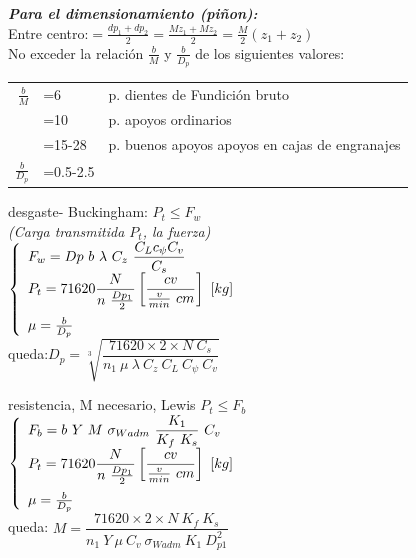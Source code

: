 \documentclass[11pt,a4paper]{article}
\begin{document}
\begin{multicols}{2}
			\textbf{\textit{Para el dimensionamiento (piñon):}}\\
			\textbullet Entre centro:$=\frac{dp_1+dp_2}{2}=\frac{M z_1+ M z_2}{2}=\frac{M}{2}(z_1+z_2)$\\\vspace*{0.2cm}
			\textbullet No exceder la relación $\frac{b}{M}$ y $\frac{b}{D_p}$ de los siguientes valores:\\
			\begin{tabular}{r l p{}}
				$\frac{b}{M}$&=6& p. dientes de Fundición bruto\\
							&=10& p. apoyos ordinarios\\
							&=15-28& p. buenos apoyos apoyos \newline en cajas de engranajes\\
				$\frac{b}{D_p}$&=0.5-2.5&\\
			\end{tabular}\vspace*{0.2cm}
			\textbullet desgaste- Buckingham: $P_t\leq F_w$\\
			\textit{(Carga transmitida $P_t$, la fuerza)}\\\vspace*{0.08cm}
			$\left\{\begin{array}{l}
				
				F_w=Dp ~b ~\lambda ~C_z ~\dfrac{C_L c_\psi C_v}{C_s}\\\vspace*{0.2cm}
				P_t=71620\dfrac{N}{n~\frac{Dp_1}{2}} \left[\dfrac{cv}{\frac{v}{min}~cm}\right]~\left[kg\right]\\ 
				\mu=\frac{b}{D_p}
			\end{array}\right.$\\
			queda:$D_p=\sqrt[3]{\dfrac{71620 \times 2 \times N~C_s}{n_1~\mu~\lambda~C_z~C_L~C_\psi~C_v}}$\\\vspace*{0.2cm}

			\textbullet resistencia, M necesario, Lewis	$P_t\leq F_b$\\
			$\left\{\begin{array}{l}
				
				F_b=b ~Y ~M ~\sigma_{Wadm} ~\dfrac{K_1}{K_f ~K_s}~C_v\\\vspace*{0.2cm}
				P_t=71620\dfrac{N}{n~\frac{Dp_1}{2}} \left[\dfrac{cv}{\frac{v}{min}~cm}\right]~\left[kg\right]\\ 
				\mu=\frac{b}{D_p}
			\end{array}\right.$\\
			queda: $M=\dfrac{71620\times 2\times N~K_f ~K_s}{n_1~Y~\mu~C_v~\sigma_{Wadm}~K_1~D_{p1}^2}$\\
			\vfill\columnbreak
			 


\end{multicols}
\end{document}
